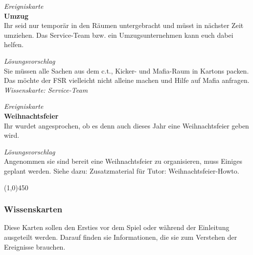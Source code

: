\documentclass[a4paper,11pt]{scrartcl} %
\begin{document}
\begin{framed}
\textit{Ereigniskarte} \\

\textbf{Umzug}  \\
Ihr seid nur temporär in den Räumen untergebracht und müsst in nächster 
Zeit umziehen. Das Service-Team bzw. ein Umzugsunternehmen kann euch 
dabei helfen.
\end{framed}

\begin{framed}
\textit{Lösungsvorschlag} \\

Sie müssen alle Sachen aus dem c.t., Kicker- und Mafia-Raum in Kartons 
packen. Das möchte der FSR vielleicht nicht alleine machen und Hilfe 
auf Mafia anfragen. \\

\textit{Wissenskarte: Service-Team}
\end{framed}

\begin{framed}
\textit{Ereigniskarte} \\

\textbf{Weihnachtsfeier} \\
Ihr wurdet angesprochen, ob es denn auch dieses Jahr eine 
Weihnachtsfeier geben wird.
\end{framed}

\begin{framed}
\textit{Lösungsvorschlag} \\

Angenommen sie sind bereit eine Weihnachtsfeier zu organisieren, muss 
Einiges geplant werden. 
Siehe dazu: Zusatzmaterial für Tutor: Weihnachtsfeier-Howto.
\end{framed} 



\begin{center}
\line(1,0){450}
\end{center}

\subsubsection{Wissenskarten}

Diese Karten sollen den Ersties vor dem Spiel oder während der Einleitung 
ausgeteilt werden. Darauf finden sie Informationen, 
die sie zum Verstehen der Ereignisse brauchen.
\end{document}
